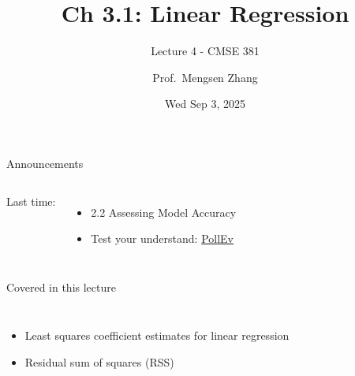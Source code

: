 \documentclass[aspectratio=169,usenames,dvipsnames]{beamer}
\begin{document}
\title[]{Ch 3.1: Linear Regression}
\subtitle{Lecture 4 - CMSE 381}
\date{Wed Sep 3, 2025}



\author[Dr.~Zhang]{Prof.~Mengsen Zhang}

\begin{frame}
 \titlepage


\end{frame}
\begin{frame}[c]{Announcements}

\begin{columns}
\centering

	Last time:
	\begin{itemize}
		\item 2.2 Assessing Model Accuracy
		\item Test your understand: \href{https://PollEv.com/multiple_choice_polls/RTTmYbCDU0XODc5Zyk5Qa/respond}{PollEv}
	\end{itemize}
\centering

\end{columns}

\end{frame}
\begin{frame}[c]{Covered in this lecture }

\begin{columns}
\centering
\begin{itemize}
	\item Least squares coefficient estimates for linear regression
	\item Residual sum of squares (RSS)
\end{itemize}
\centering

\end{columns}

\end{frame}
\end{document}
